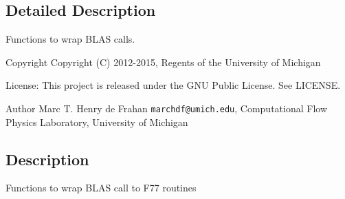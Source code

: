 \subsection{Detailed Description}
Functions to wrap B\-L\-A\-S calls. \begin{DoxyCopyright}{Copyright}
Copyright (C) 2012-\/2015, Regents of the University of Michigan 
\end{DoxyCopyright}
\begin{DoxyParagraph}{License\-:}
This project is released under the G\-N\-U Public License. See L\-I\-C\-E\-N\-S\-E. 
\end{DoxyParagraph}
\begin{DoxyAuthor}{Author}
Marc T. Henry de Frahan {\tt marchdf@umich.\-edu}, Computational Flow Physics Laboratory, University of Michigan 
\end{DoxyAuthor}
\subsection{Description}\label{scalar__def_8h_Description}
Functions to wrap B\-L\-A\-S call to F77 routines 